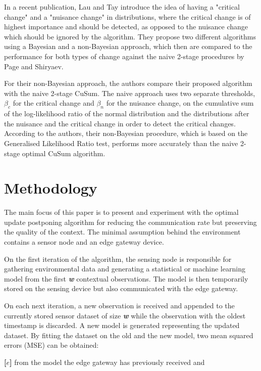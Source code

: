\documentclass{mpaper}
\begin{document}
In a recent publication, Lau and Tay\cite{lautay2018} introduce the idea of having a "critical change" and a "nuisance change" in distributions, where the critical change is of highest importance and should be detected, as opposed to the nuisance change which should be ignored by the algorithm. They propose two different algorithms using a Bayesian and a non-Bayesian approach, which then are compared to the performance for both types of change against the naive 2-stage procedures by Page\cite{page1954} and Shiryaev\cite{shiryaev1963}.

For their non-Bayesian approach, the authors compare their proposed algorithm with the naive 2-stage CuSum. The naive approach uses two separate thresholds, $\beta_c$ for the critical change and $\beta_n$ for the nuisance change, on the cumulative sum of the log-likelihood ratio of the normal distribution and the distributions after the nuisance and the critical change in order to detect the critical changes.
According to the authors, their non-Bayesian procedure, which is based on the Generalised Likelihood Ratio test, performs more accurately than the naive 2-stage optimal CuSum algorithm.

\section{Methodology}

The main focus of this paper is to present and experiment with the optimal update postponing algorithm for reducing the communication rate but preserving the quality of the context. 
The minimal assumption behind the environment contains a sensor node and an edge gateway device. 

On the first iteration of the algorithm, the sensing node is responsible for gathering environmental data and generating a statistical or machine learning model from the first \textbf{\emph{w}} contextual observations. The model is then temporarily stored on the sensing device but also communicated with the edge gateway.

On each next iteration, a new observation is received and appended to the currently stored sensor dataset of size \textbf{\emph{w}} while the observation with the oldest timestamp is discarded. A new model is generated representing the updated dataset. By fitting the dataset on the old and the new model, two mean squared errors (MSE) can be obtained:

\textbf{[$e$]} from the model the edge gateway has previously received and
\end{document}
